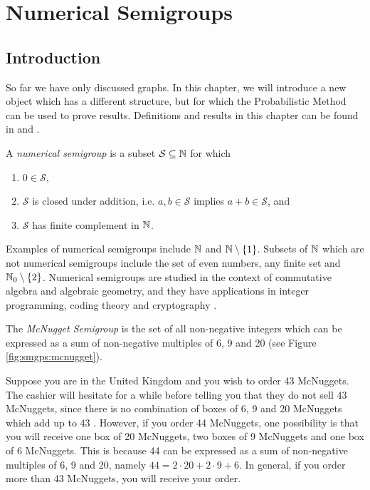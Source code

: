 \chapter{Numerical Semigroups}\label{chap:numsems}

\section{Introduction}\label{sec:smgps:intro}

So far we have only discussed graphs. In this chapter, we will introduce a new object which has a different structure, but for which the Probabilistic Method can be used to prove results. Definitions and results in this chapter can be found in \cite{rosales2009numerical} and \cite{assi2020numerical}. \par

\begin{definition} 
    A \textit{numerical semigroup} is a subset $\mathcal{S} \subseteq \mathbb{N}$ for which 
    \begin{enumerate}
        \item $0 \in \mathcal{S}$,
        \item $\mathcal{S}$ is closed under addition, i.e. $a, b \in \mathcal{S}$ implies $a + b \in \mathcal{S}$, and
        \item $\mathcal{S}$ has finite complement in $\mathbb{N}$.
    \end{enumerate}
\end{definition}

Examples of numerical semigroups include $\mathbb{N}$ and $\mathbb{N}\setminus \{1\}$. Subsets of $\mathbb{N}$ which are not numerical semigroups include the set of even numbers, any finite set and $\mathbb{N}_0 \setminus \{2\}$. Numerical semigroups are studied in the context of commutative algebra and algebraic geometry, and they have applications in integer programming, coding theory and cryptography \cite{assi2020numerical}. \par

\begin{example}\label{ex:smgps:mcnugget}
    The \textit{McNugget Semigroup} is the set of all non-negative integers which can be expressed as a sum of non-negative multiples of 6, 9 and 20 (see Figure \ref{fig:smgps:mcnugget}).
\end{example}

Suppose you are in the United Kingdom and you wish to order 43 McNuggets. The cashier will hesitate for a while before telling you that they do not sell 43 McNuggets, since there is no combination of boxes of 6, 9 and 20 McNuggets which add up to 43 \cite{youtube}. However, if you order 44 McNuggets, one possibility is that you will receive one box of 20 McNuggets, two boxes of 9 McNuggets and one box of 6 McNuggets. This is because 44 can be expressed as a sum of non-negative multiples of 6, 9 and 20, namely $44 = 2 \cdot 20 + 2 \cdot 9 + 6$. In general, if you order more than 43 McNuggets, you will receive your order. \par

